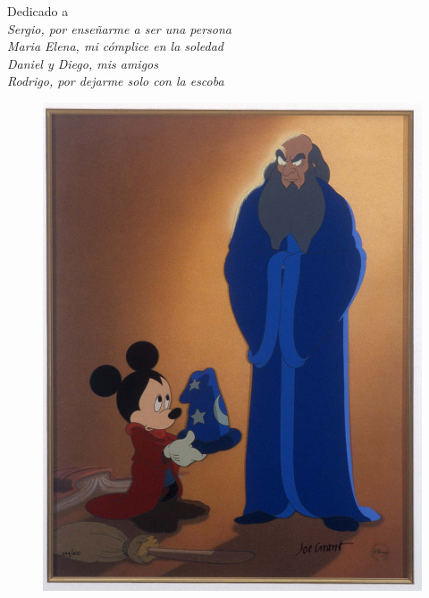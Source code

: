 \thispagestyle{empty}
{}

\vspace*{2cm}


\begin{center}
    Dedicado a \\ \medskip
    {\it
        Sergio, por enseñarme a ser una persona \\ \smallskip
        Maria Elena, mi cómplice en la soledad \\ \smallskip
        Daniel y Diego, mis amigos \\ \smallskip
    Rodrigo, por dejarme solo con la escoba}

\end{center}

\vspace*{1cm}

\begin{center}
    \begin{figure}[h!]
        \includegraphics[width=1.0\textwidth]{fantasia}
    \end{figure}
\end{center}
\null

